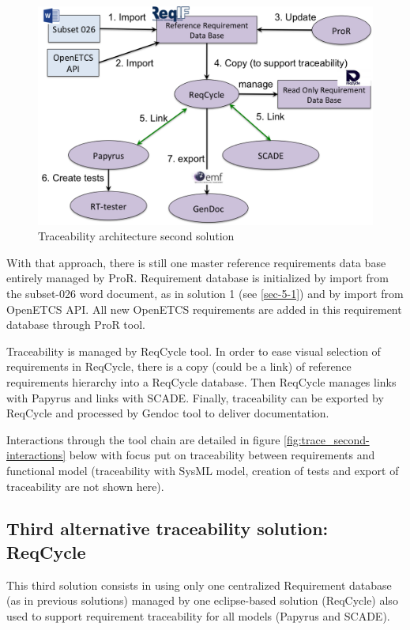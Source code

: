 \documentclass[11pt]{template/openetcs_report}
\begin{document}
\begin{figure}[htb]
\centering
\includegraphics[width=.9\linewidth]{images/second_trace_solution-ProR-ReqCycle.png}
\caption{\label{fig:trace_second}Traceability architecture second solution}
\end{figure}

With that approach, there is still one master reference requirements data base entirely managed by ProR. Requirement database is initialized by import from the subset-026 word document, as in solution 1 (see \ref{sec-5-1}) and by import from OpenETCS API.
All new OpenETCS requirements are added in this requirement database through ProR tool.

Traceability is managed by ReqCycle tool. In order to ease visual selection of requirements in ReqCycle, there is a copy (could be a link) of reference requirements hierarchy into a ReqCycle database. Then ReqCycle manages links with Papyrus and links with SCADE. 
Finally, traceability can be exported by ReqCycle and processed by Gendoc tool to deliver documentation.

Interactions through the tool chain are detailed in figure \ref{fig:trace_second-interactions} below with focus put on traceability between requirements and functional model (traceability with SysML model, creation of tests and export of traceability are not shown here). 



\subsection{Third alternative traceability solution: ReqCycle}

This third solution consists in using only one centralized Requirement database (as in previous solutions) managed by one eclipse-based solution (ReqCycle) also used to support requirement traceability for all models (Papyrus and SCADE).
\end{document}
